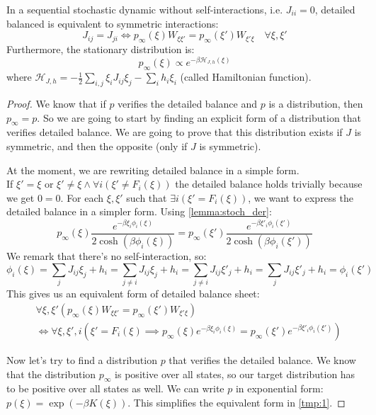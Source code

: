 \begin{theorem} \label{teo:Inv_Mea}
    In a sequential stochastic dynamic without self-interactions, i.e. $J_{ii}=0$, detailed balanced is equivalent to symmetric interactions:
    \[
    J_{ij}= J_{ji} \iff p_\infty(\xi) W_{\xi\xi'} = p_\infty(\xi') W_{\xi'\xi} \quad \forall \xi,\xi'
    \]
    Furthermore, the stationary distribution is:
    \[
    p_{\infty}(\xi) \propto e^{-\beta \mathcal{H}_{J,h}(\xi)}
    \]
    where $\mathcal{H}_{J,h} =  -\frac{1}{2} \sum_{i,j} \xi_i J_{ij} \xi_j - \sum_{i} h_i \xi_i$ (called Hamiltonian function).
    \begin{proof}
        We know that if $p$ verifies the detailed balance and $p$ is a distribution, then $p_\infty=p$. So we are going to start by finding an explicit form of a distribution that verifies detailed balance. We are going to prove that this distribution exists if $J$ is symmetric, and then the opposite (only if $J$ is symmetric).

        \bigskip\noindent At the moment, we are rewriting detailed balance in a simple form. \\ If $\xi'=\xi$ or $\xi'\neq\xi \land \forall i\left(\xi' \neq F_i(\xi)\right)$ the detailed balance holds trivially because we get $0=0$. For each $\xi,\xi'$ such that $\exists i\left(\xi' = F_i(\xi)\right)$, we want to express the detailed balance in a simpler form. Using \cref{lemma:stoch_der}:
        \[
            p_{\infty}(\xi) \frac{e^{-\beta \xi_i \phi_i(\xi)}}{2\cosh(\beta\phi_i(\xi))} = p_{\infty}(\xi') \frac{e^{-\beta \xi'_i \phi_i(\xi')}}{2\cosh(\beta\phi_i(\xi'))}
        \]
        We remark that there's no self-interaction, so:
        \[
            \phi_i(\xi) = \sum_j J_{ij}\xi_j+h_i = \sum_{j\neq i} J_{ij}\xi_j + h_i = \sum_{j\neq i} J_{ij}\xi'_j + h_i = \sum_{j} J_{ij}\xi'_j + h_i = \phi_i ( \xi')
        \]
        This gives us an equivalent form of detailed balance sheet:
        \begin{align}
            \label{tmp:1}
            &\forall \xi,\xi'\left(p_\infty(\xi) W_{\xi\xi'} = p_\infty(\xi') W_{\xi'\xi}\right) \\
            &\iff \forall \xi,\xi',i\left(\xi' = F_i(\xi) \implies p_{\infty}(\xi) e^{-\beta \xi_i \phi_i(\xi)} = p_{\infty}(\xi') e^{-\beta \xi'_i \phi_i(\xi')} \right) \nonumber
        \end{align}

        \bigskip\noindent Now let's try to find a distribution $p$ that verifies the detailed balance. We know that the distribution $p_\infty$ is positive over all states, so our target distribution has to be positive over all states as well. We can write $p$ in exponential form: $p\left(\xi\right)=\exp\left(-\beta K(\xi)\right)$. This simplifies the equivalent form in \cref{tmp:1}.


\end{proof}
\end{theorem}
